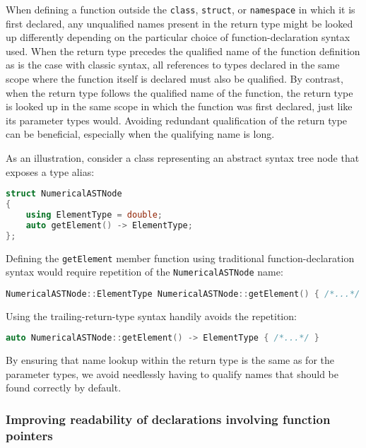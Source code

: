 When defining a function outside the \lstinline!class!, \lstinline!struct!, or
\lstinline!namespace! in which it is first declared, any unqualified names
present in the return type might be looked up differently depending on
the particular choice of function-declaration syntax used. When the
return type precedes the qualified name of the function definition as
is the case with classic syntax, all references to types declared in
the same scope where the function itself is declared must also be
qualified. By contrast, when the return type follows the
qualified name of the function, 
the return type is looked up in the same scope in which the
function was first declared, just like its parameter types would. Avoiding redundant qualification of the return type  can be beneficial, especially when the qualifying name is long.

As an illustration, consider a class representing an abstract syntax
tree node that exposes a type alias:

\begin{lstlisting}[language=C++]
struct NumericalASTNode
{
    using ElementType = double;
    auto getElement() -> ElementType;
};
\end{lstlisting}
    
\noindent Defining the \lstinline!getElement! member function using traditional
function-declaration syntax would require repetition of the
\lstinline!NumericalASTNode! name:

\begin{lstlisting}[language=C++]
NumericalASTNode::ElementType NumericalASTNode::getElement() { /*...*/ }
\end{lstlisting}
    
\noindent Using the trailing-return-type syntax handily avoids the repetition:

\begin{lstlisting}[language=C++]
auto NumericalASTNode::getElement() -> ElementType { /*...*/ }
\end{lstlisting}
    
\noindent By ensuring that name lookup within the return type is the same as for
the parameter types, we avoid needlessly having to qualify names that
should be found correctly by default.

\subsubsection[Improving readability of declarations involving function pointers]{Improving readability of declarations involving function pointers}\label{improving-readability-of-declarations-involving-function-pointers}

